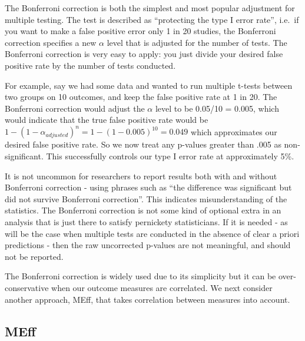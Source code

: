 \documentclass{krantz}
\begin{document}
The Bonferroni correction is both the simplest and most popular adjustment for multiple testing. The test is described as ``protecting the type I error rate'', i.e.~if you want to make a false positive error only 1 in 20 studies, the Bonferroni correction specifies a new \(\alpha\) level that is adjusted for the number of tests. The Bonferroni correction is very easy to apply: you just divide your desired false positive rate by the number of tests conducted.

For example, say we had some data and wanted to run multiple t-tests between two groups on 10 outcomes, and keep the false positive rate at 1 in 20. The Bonferroni correction would adjust the \(\alpha\) level to be 0.05/10 = 0.005, which would indicate that the true false positive rate would be \(1-(1-\alpha_{adjusted})^{n} = 1-(1-0.005)^{10} = 0.049\) which approximates our desired false positive rate. So we now treat any p-values greater than .005 as non-significant. This successfully controls our type I error rate at approximately 5\%.

It is not uncommon for researchers to report results both with and without Bonferroni correction - using phrases such as ``the difference was significant but did not survive Bonferroni correction''. This indicates misunderstanding of the statistics. The Bonferroni correction is not some kind of optional extra in an analysis that is just there to satisfy pernickety statisticians. If it is needed - as will be the case when multiple tests are conducted in the absence of clear a priori predictions - then the raw uncorrected p-values are not meaningful, and should not be reported.

The Bonferroni correction is widely used due to its simplicity but it can be over-conservative when our outcome measures are correlated. We next consider another approach, MEff, that takes correlation between measures into account.

\hypertarget{meff}{%
\subsection{MEff}\label{meff}}
\end{document}

